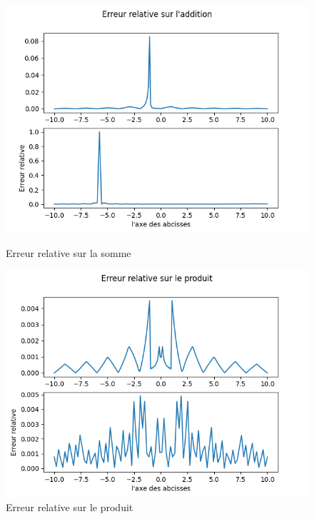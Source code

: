 \documentclass{article}
\begin{document}
\begin{figure}[ht]
    \begin{minipage}{0.48\textwidth}
        \centering
        \includegraphics[scale=0.48]{images/erreur_add.png}
        \caption{Erreur relative sur la somme}
        \label{fig:erreur_sur_la_somme_2}
    \end{minipage}\hfill
    \begin{minipage}{0.48\textwidth}
        \centering
        \includegraphics[scale=0.48]{images/erreur_prod.png}
        \caption{Erreur relative sur le produit}
        \label{fig:erreur_sur_le_produit_2}
    \end{minipage}
\end{figure}
\end{document}
